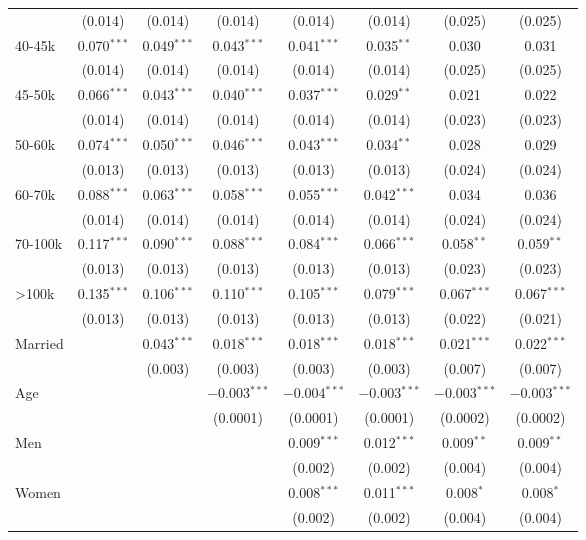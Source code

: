 \begin{table}[!htbp]
\begin{tabular}{@{\extracolsep{5pt}}lccccccc}
  & (0.014) & (0.014) & (0.014) & (0.014) & (0.014) & (0.025) & (0.025) \\ 
  40-45k & 0.070$^{***}$ & 0.049$^{***}$ & 0.043$^{***}$ & 0.041$^{***}$ & 0.035$^{**}$ & 0.030 & 0.031 \\ 
  & (0.014) & (0.014) & (0.014) & (0.014) & (0.014) & (0.025) & (0.025) \\ 
  45-50k & 0.066$^{***}$ & 0.043$^{***}$ & 0.040$^{***}$ & 0.037$^{***}$ & 0.029$^{**}$ & 0.021 & 0.022 \\ 
  & (0.014) & (0.014) & (0.014) & (0.014) & (0.014) & (0.023) & (0.023) \\ 
  50-60k & 0.074$^{***}$ & 0.050$^{***}$ & 0.046$^{***}$ & 0.043$^{***}$ & 0.034$^{**}$ & 0.028 & 0.029 \\ 
  & (0.013) & (0.013) & (0.013) & (0.013) & (0.013) & (0.024) & (0.024) \\ 
  60-70k & 0.088$^{***}$ & 0.063$^{***}$ & 0.058$^{***}$ & 0.055$^{***}$ & 0.042$^{***}$ & 0.034 & 0.036 \\ 
  & (0.014) & (0.014) & (0.014) & (0.014) & (0.014) & (0.024) & (0.024) \\ 
  70-100k & 0.117$^{***}$ & 0.090$^{***}$ & 0.088$^{***}$ & 0.084$^{***}$ & 0.066$^{***}$ & 0.058$^{**}$ & 0.059$^{**}$ \\ 
  & (0.013) & (0.013) & (0.013) & (0.013) & (0.013) & (0.023) & (0.023) \\ 
  >100k & 0.135$^{***}$ & 0.106$^{***}$ & 0.110$^{***}$ & 0.105$^{***}$ & 0.079$^{***}$ & 0.067$^{***}$ & 0.067$^{***}$ \\ 
  & (0.013) & (0.013) & (0.013) & (0.013) & (0.013) & (0.022) & (0.021) \\ 
  Married &  & 0.043$^{***}$ & 0.018$^{***}$ & 0.018$^{***}$ & 0.018$^{***}$ & 0.021$^{***}$ & 0.022$^{***}$ \\ 
  &  & (0.003) & (0.003) & (0.003) & (0.003) & (0.007) & (0.007) \\ 
  Age &  &  & $-$0.003$^{***}$ & $-$0.004$^{***}$ & $-$0.003$^{***}$ & $-$0.003$^{***}$ & $-$0.003$^{***}$ \\ 
  &  &  & (0.0001) & (0.0001) & (0.0001) & (0.0002) & (0.0002) \\ 
  Men &  &  &  & 0.009$^{***}$ & 0.012$^{***}$ & 0.009$^{**}$ & 0.009$^{**}$ \\ 
  &  &  &  & (0.002) & (0.002) & (0.004) & (0.004) \\ 
  Women &  &  &  & 0.008$^{***}$ & 0.011$^{***}$ & 0.008$^{*}$ & 0.008$^{*}$ \\ 
  &  &  &  & (0.002) & (0.002) & (0.004) & (0.004) \\ 

\end{tabular}
\end{table}
